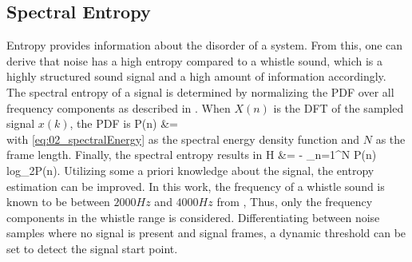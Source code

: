 \subsection{Spectral Entropy}
\label{subsec:02_Entropy}

Entropy provides information about the disorder of a system.
From this, one can derive that noise has a high entropy compared to
a whistle sound, which is a highly structured sound signal and a high
amount of information accordingly.
The spectral entropy of a signal is determined by normalizing the
\ac{PDF} over all frequency components as described in \cite{S_J_entropy}.
When $X(n)$ is the \ac{DFT} of the sampled signal $x(k)$, the \ac{PDF} is
\bal
    P(n) &= 
    \label{eq:02_pdf}\\
\eal
with \ref{eq:02_spectralEnergy} as the spectral energy density function and $N$
as the frame length.
Finally, the spectral entropy results in
\bal
    H &= - \sum_{n=1}^N P(n) log_2P(n).
\eal
\label{eq:02_entropy}
Utilizing some a priori knowledge about the signal, the entropy estimation
can be improved.
In this work, the frequency of a whistle sound is known to be
between $2000\si{Hz}$ and $4000\si{Hz}$ from \cite{Hasselbring},
Thus, only the frequency components in the whistle range is considered.
Differentiating between noise samples where no signal is present and
signal frames, a dynamic threshold can be set to detect the signal start point.